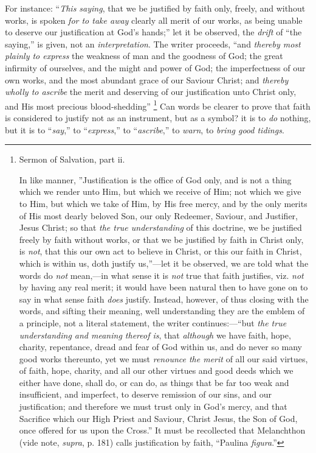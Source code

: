 For instance: ``\emph{This saying}, that we be justified by
faith only, freely, and without works, is spoken \emph{for to take away}
clearly all merit of our works, as being unable to deserve our
justification at God's hands;'' let it be observed, the \emph{drift}
of ``the saying,'' is given, not an \emph{interpretation}. The
writer proceeds, ``and \emph{thereby most plainly to express} the
weakness of man and the goodness of God; the great infirmity of
ourselves, and the might and power of God; the imperfectness of our
own works, and the most abundant grace of our Saviour Christ; and \emph{thereby
wholly to ascribe} the merit and deserving of our justification
unto Christ only, and His most precious blood-shedding'' \footnote{Sermon of
Salvation, part ii.

In like manner, ''Justification is the office of God only, and is
not a thing which we render unto Him, but which we receive of Him; not
which we give to Him, but which we take of Him, by His free mercy, and
by the only merits of His most dearly beloved Son, our only Redeemer,
Saviour, and Justifier, Jesus Christ; so that \emph{the true
understanding} of this doctrine, we be justified freely by faith
without works, or that we be justified by faith in Christ only, is \emph{not},
that this our own act to believe in Christ, or this our faith in
Christ, which is within us, doth justify us,''—let it be
observed, we are told what the words do \emph{not} mean,—in what
sense it is \emph{not} true that faith justifies, viz. \emph{not} by
having any real merit; it would have been natural then to have gone on
to say in what sense faith \emph{does} justify. Instead, however, of
thus closing with the words, and sifting their meaning, well
understanding they are the emblem of a principle, not a literal
statement, the writer continues:—``but \emph{the true understanding
and meaning thereof is}, that \emph{although} we have faith, hope,
charity, repentance, dread and fear of God within us, and do never so
many good works thereunto, yet we must \emph{renounce the merit} of
all our said virtues, of faith, hope, charity, and all our other
virtues and good deeds which we either have done, shall do, or can do,
as things that be far too weak and insufficient, and imperfect, to
deserve remission of our sins, and our justification; and therefore we
must trust only in God's mercy, and that Sacrifice which our High
Priest and Saviour, Christ Jesus, the Son of God, once offered for us
upon the Cross.'' It must be recollected that Melanchthon (vide note, \emph{supra}, p. 181) calls justification by faith, ``Paulina
\emph{figura}.''} Can words be clearer to prove that faith is considered to
justify not as an instrument, but as a symbol? it is to \emph{do}
nothing, but it is to ``\emph{say},'' to ``\emph{express},''
to ``\emph{ascribe},'' to \emph{warn}, to \emph{bring good
tidings}.

